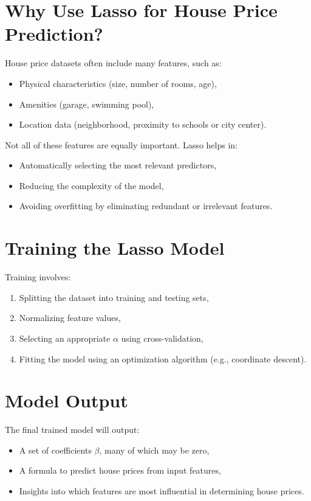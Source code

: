 \documentclass[12pt, a4paper]{report}
\begin{document}
\section{Why Use Lasso for House Price Prediction?}

House price datasets often include many features, such as:
\begin{itemize}
    \item Physical characteristics (size, number of rooms, age),
    \item Amenities (garage, swimming pool),
    \item Location data (neighborhood, proximity to schools or city center).
\end{itemize}

Not all of these features are equally important. Lasso helps in:
\begin{itemize}
    \item Automatically selecting the most relevant predictors,
    \item Reducing the complexity of the model,
    \item Avoiding overfitting by eliminating redundant or irrelevant features.
\end{itemize}

\section{Training the Lasso Model}

Training involves:
\begin{enumerate}
    \item Splitting the dataset into training and testing sets,
    \item Normalizing feature values,
    \item Selecting an appropriate \( \alpha \) using cross-validation,
    \item Fitting the model using an optimization algorithm (e.g., coordinate descent).
\end{enumerate}

\section{Model Output}

The final trained model will output:
\begin{itemize}
    \item A set of coefficients \( \beta \), many of which may be zero,
    \item A formula to predict house prices from input features,
    \item Insights into which features are most influential in determining house prices.
\end{itemize}
\end{document}
